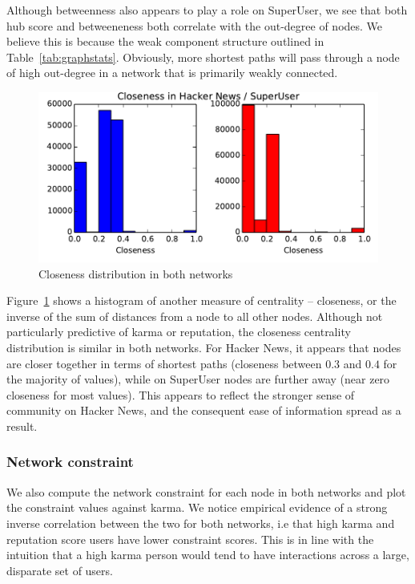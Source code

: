 \documentclass[11pt]{article}
\begin{document}
Although betweenness also appears to play a role on SuperUser, we see that
both hub score and betweeneness both correlate with the out-degree of nodes.
We believe this is because the weak component structure outlined in 
Table~\ref{tab:graphstats}. Obviously, more shortest paths will pass through a
node of high out-degree in a network that is primarily weakly connected.

\begin{figure}[h]
\centering
\includegraphics[width=\linewidth]{closeness}
\caption{Closeness distribution in both networks}
\label{fig:closeness}
\end{figure}

Figure~\ref{fig:closeness} shows a histogram of another measure of centrality --
closeness, or the inverse of the sum of distances from a node to all other
nodes.  Although not particularly predictive of karma or reputation, the
closeness centrality distribution is similar in both networks. For Hacker News,
it appears that nodes are closer together in terms of shortest paths (closeness
between $0.3$ and $0.4$ for the majority of values), while on SuperUser nodes
are further away (near zero closeness for most values). This appears to reflect
the stronger sense of community on Hacker News, and the consequent ease of
information spread as a result.

\subsubsection{Network constraint}

We also compute the network constraint for each node in both networks and plot
the constraint values against karma. We notice empirical evidence of a strong
inverse correlation between the two for both networks, i.e that high karma and
reputation score users have lower constraint scores. This is in line with the
intuition that a high karma person would tend to have interactions across a
large, disparate set of users.
\end{document}
